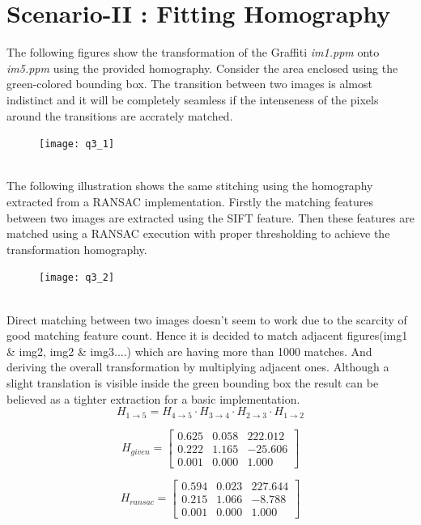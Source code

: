 \section*{Scenario-II : Fitting Homography}
The following figures show the transformation of the Graffiti \textit{im1.ppm} onto \textit{im5.ppm} using the provided homography. Consider the area enclosed using the green-colored bounding box. The transition between two images is almost indistinct and it will be completely seamless if the intenseness of the pixels around the transitions are accrately matched.
\begin{figure}[h]
    \begin{center}
        \texttt{[image: q3\_1]}
    \end{center}
\end{figure}
\\
The following illustration shows the same stitching using the homography extracted from a RANSAC implementation. Firstly the matching features between two images are extracted using the SIFT feature. Then these features are matched using a RANSAC execution with proper thresholding to achieve the transformation homography.
\begin{figure}[h]
    \begin{center}
        \texttt{[image: q3\_2]}
    \end{center}
\end{figure}
\\
Direct matching between two images doesn't seem to work due to the scarcity of good matching feature count. Hence it is decided to match adjacent figures(img1 \& img2, img2 \& img3....) which are having more than 1000 matches. And deriving the overall transformation by multiplying adjacent ones. Although a slight translation is visible inside the green bounding box the result can be believed as a tighter extraction for a basic implementation.
$$H_{1\to5}=H_{4\to5}\cdot H_{3\to4}\cdot H_{2\to3}\cdot H_{1\to2}$$
\vspace*{.2cm}
\begin{minipage}{.48\textwidth}
    \begin{equation*}
        H_{given}=\begin{bmatrix}
            0.625 & 0.058 & 222.012 \\
            0.222 & 1.165 & -25.606 \\
            0.001 & 0.000 & 1.000
        \end{bmatrix}
    \end{equation*}

\end{minipage}
\begin{minipage}{.48\textwidth}
    \begin{equation*}
        H_{ransac}=\begin{bmatrix}
            0.594 & 0.023 & 227.644 \\
            0.215 & 1.066 & -8.788  \\
            0.001 & 0.000 & 1.000
        \end{bmatrix}
    \end{equation*}
\end{minipage}
